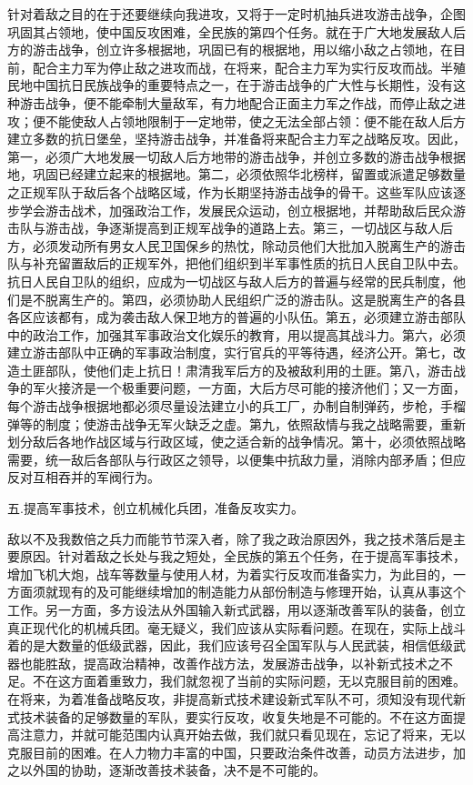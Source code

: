 针对着敌之目的在于还要继续向我进攻，又将于一定时机抽兵进攻游击战争，企图巩固其占领地，使中国反攻困难，全民族的第四个任务。就在于广大地发展敌人后方的游击战争，创立许多根据地，巩固已有的根据地，用以缩小敌之占领地，在目前，配合主力军为停止敌之进攻而战，在将来，配合主力军为实行反攻而战。半殖民地中国抗日民族战争的重要特点之一，在于游击战争的广大性与长期性，没有这种游击战争，便不能牵制大量敌军，有力地配合正面主力军之作战，而停止敌之进攻；便不能使敌人占领地限制于一定地带，使之无法全部占领：便不能在敌人后方建立多数的抗日堡垒，坚持游击战争，并准备将来配合主力军之战略反攻。因此，第一，必须广大地发展一切敌人后方地带的游击战争，并创立多数的游击战争根据地，巩固已经建立起来的根据地。第二，必须依照华北榜样，留置或派遣足够数量之正规军队于敌后各个战略区域，作为长期坚持游击战争的骨干。这些军队应该逐步学会游击战术，加强政治工作，发展民众运动，创立根据地，并帮助敌后民众游击队与游击战，争逐渐提高到正规军战争的道路上去。第三，一切战区与敌人后方，必须发动所有男女人民卫国保乡的热忱，除动员他们大批加入脱离生产的游击队与补充留置敌后的正规军外，把他们组织到半军事性质的抗日人民自卫队中去。抗日人民自卫队的组织，应成为一切战区与敌人后方的普遍与经常的民兵制度，他们是不脱离生产的。第四，必须协助人民组织广泛的游击队。这是脱离生产的各县各区应该都有，成为袭击敌人保卫地方的普遍的小队伍。第五，必须建立游击部队中的政治工作，加强其军事政治文化娱乐的教育，用以提高其战斗力。第六，必须建立游击部队中正确的军事政治制度，实行官兵的平等待遇，经济公开。第七，改造土匪部队，使他们走上抗日！肃清我军后方的及被敌利用的土匪。第八，游击战争的军火接济是一个极重要问题，一方面，大后方尽可能的接济他们；又一方面，每个游击战争根据地都必须尽量设法建立小的兵工厂，办制自制弹药，步枪，手榴弹等的制度；使游击战争无军火缺乏之虚。第九，依照敌情与我之战略需要，重新划分敌后各地作战区域与行政区域，使之适合新的战争情况。第十，必须依照战略需要，统一敌后各部队与行政区之领导，以便集中抗敌力量，消除内部矛盾；但应反对互相吞并的军阀行为。

五.提高军事技术，创立机械化兵团，准备反攻实力。

敌以不及我数倍之兵力而能节节深入者，除了我之政治原因外，我之技术落后是主要原因。针对着敌之长处与我之短处，全民族的第五个任务，在于提高军事技术，增加飞机大炮，战车等数量与使用人材，为着实行反攻而准备实力，为此目的，一方面须就现有的及可能继续增加的制造能力从部份制造与修理开始，认真从事这个工作。另一方面，多方设法从外国输入新式武器，用以逐渐改善军队的装备，创立真正现代化的机械兵团。毫无疑义，我们应该从实际看问题。在现在，实际上战斗着的是大数量的低级武器，因此，我们应该号召全国军队与人民武装，相信低级武器也能胜敌，提高政治精神，改善作战方法，发展游击战争，以补新式技术之不足。不在这方面着重致力，我们就忽视了当前的实际问题，无以克服目前的困难。在将来，为着准备战略反攻，非提高新式技术建设新式军队不可，须知没有现代新式技术装备的足够数量的军队，要实行反攻，收复失地是不可能的。不在这方面提高注意力，并就可能范围内认真开始去做，我们就只看见现在，忘记了将来，无以克服目前的困难。在人力物力丰富的中国，只要政治条件改善，动员方法进步，加之以外国的协助，逐渐改善技术装备，决不是不可能的。

